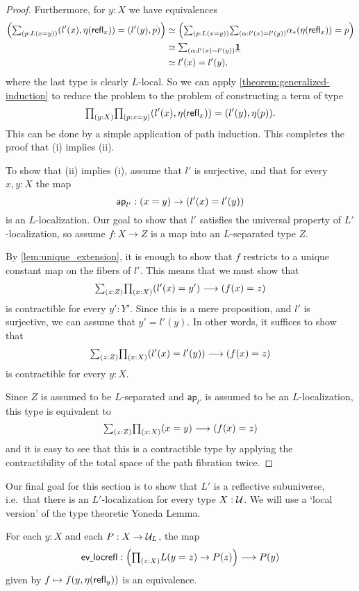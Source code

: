 \begin{proof}
Furthermore, for $y : X$ we have equivalences
\begin{align*}
    \Big(\sm{p:L(x=y)}(l'(x),\eta(\refl{x}))=(l'(y),p)\Big)
 & \eqvsym \Big(\sm{p:L(x=y)}{\alpha:l'(x)=l'(y)} \trans{\alpha}{\eta(\refl{x})} = p \Big) \\
 & \eqvsym \sm{\alpha:l'(x) = l'(y)} \unit \\
 & \eqvsym l'(x) = l'(y),
\end{align*}
where the last type is clearly $L$-local.
So we can apply \cref{theorem:generalized-induction} to reduce the problem to
the problem of constructing a term of type
\begin{equation*}
    \prd{y:X}{p:x=y}(l'(x),\eta(\refl{x}))=(l'(y),\eta(p)).
\end{equation*}
This can be done by a simple application of path induction. This completes the proof that (i) implies (ii).

To show that (ii) implies (i), assume that $l'$ is surjective, and that for every $x,y:X$ the map
\begin{equation*}
\mathsf{ap}_{l'}:(x=y)\to (l'(x)=l'(y))
\end{equation*}
is an $L$-localization. Our goal to show that $l'$ satisfies the universal property of $L'$-localization, so assume $f : X \to Z$ is a map into an $L$-separated type $Z$.

By \cref{lem:unique_extension}, it is enough to show that $f$ restricts to a unique constant map
on the fibers of $l'$. This means that we must show that
\[
  \sm{z:Z}\prd{x:X} (l'(x)=y') \lra (f(x)=z)
\]
is contractible for every $y':Y'$.
Since this is a mere proposition, and $l'$ is surjective, we can assume that
$y' = l'(y)$.  In other words, it suffices to show that
\[
  \sm{z:Z}\prd{x:X} (l'(x)=l'(y)) \lra (f(x)=z)
\]
is contractible for every $y:X$.

Since $Z$ is assumed to be $L$-separated and $\mathsf{ap}_{l'}$ is assumed to be an $L$-localization,
this type is equivalent to
\[
  \sm{z:Z}\prd{x:X} (x=y) \lra (f(x)=z)
\]
and it is easy to see that this is a contractible type by applying the contractibility of
the total space of the path fibration twice.
\end{proof}

Our final goal for this section is to show that $L'$ is a reflective subuniverse, i.e.~that there is an $L'$-localization for every type $X:\mathcal{U}$.
We will use a `local version' of the type theoretic Yoneda Lemma.

\begin{lem}\label{lemma:local_yoneda}
For each $y:X$ and each $P:X\to \mathcal{U}_L$, the map
\[
  \mathsf{ev\usc{}locrefl}:\Big(\prd{z:X}L(y=z)\to P(z)\Big) \lra P(y)
\]
given by $f\mapsto f(y,\eta(\mathsf{refl}_{y}))$ is an equivalence.
\end{lem}

